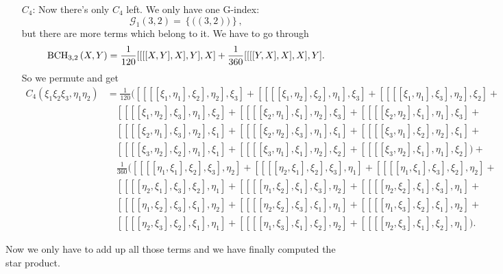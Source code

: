 \begin{itemize}
	\item[$C_4$:]
	Now there's only $C_4$ left. We only have one G-index:
	\begin{equation*}
		\mathcal{G}_1(3,2) 
		= 
		\left\{ \big( (3,2) \big) \right\},
	\end{equation*}
	but there are more terms which belong to it. We have to go through
	\begin{equation*}
		\mathrm{BCH}_{3, 2}\left(X, Y\right)
		=
		\frac{1}{120} [[[[X,Y],X],Y],X] +
		\frac{1}{360} [[[[Y,X],X],X],Y].
	\end{equation*}
	So we permute and get
	\begin{align*}
		C_4(\xi_1 \xi_2 \xi_3, \eta_1 \eta_2)
		& =
		\frac{1}{120} 
		\big( 
			[[[[\xi_1, \eta_1], \xi_2], \eta_2], \xi_3] + 
			[[[[\xi_1, \eta_2], \xi_2], \eta_1], \xi_3] + 
			[[[[\xi_1, \eta_1], \xi_3], \eta_2], \xi_2] +
		\\
		& \quad
			[[[[\xi_1, \eta_2], \xi_3], \eta_1], \xi_2] + 
			[[[[\xi_2, \eta_1], \xi_1], \eta_2], \xi_3] + 
			[[[[\xi_2, \eta_2], \xi_1], \eta_1], \xi_3] +
		\\
		& \quad
			[[[[\xi_2, \eta_1], \xi_3], \eta_2], \xi_1] + 
			[[[[\xi_2, \eta_2], \xi_3], \eta_1], \xi_1] + 
			[[[[\xi_3, \eta_1], \xi_2], \eta_2], \xi_1] +
		\\
		& \quad
			[[[[\xi_3, \eta_2], \xi_2], \eta_1], \xi_1] + 
			[[[[\xi_3, \eta_1], \xi_1], \eta_2], \xi_2] + 
			[[[[\xi_3, \eta_2], \xi_1], \eta_1], \xi_2] 
		\big) +
		\\
		& \quad
		\frac{1}{360} 
		\big( 
			[[[[\eta_1, \xi_1], \xi_2], \xi_3], \eta_2] + 
			[[[[\eta_2, \xi_1], \xi_2], \xi_3], \eta_1] + 
			[[[[\eta_1, \xi_1], \xi_3], \xi_2], \eta_2] +
		\\
		& \quad
			[[[[\eta_2, \xi_1], \xi_3], \xi_2], \eta_1] + 
			[[[[\eta_1, \xi_2], \xi_1], \xi_3], \eta_2] + 
			[[[[\eta_2, \xi_2], \xi_1], \xi_3], \eta_1] +
		\\
		& \quad
			[[[[\eta_1, \xi_2], \xi_3], \xi_1], \eta_2] + 
			[[[[\eta_2, \xi_2], \xi_3], \xi_1], \eta_1] + 
			[[[[\eta_1, \xi_3], \xi_2], \xi_1], \eta_2] +
		\\
		& \quad
			[[[[\eta_2, \xi_3], \xi_2], \xi_1], \eta_1] + 
			[[[[\eta_1, \xi_3], \xi_1], \xi_2], \eta_2] + 
			[[[[\eta_2, \xi_3], \xi_1], \xi_2], \eta_1] 
		\big).
	\end{align*}
\end{itemize}
Now we only have to add up all those terms and we have finally computed the 
star product.
